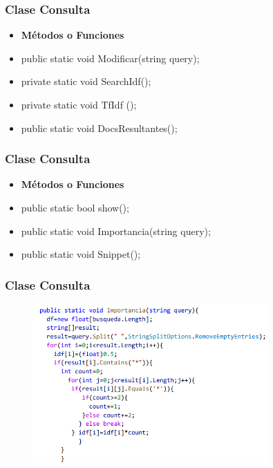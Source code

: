 \documentclass[17pt]{beamer}
\begin{document}
         \begin{frame}
\frametitle{Clase Consulta}
\begin{itemize}
    \item[] \textbf{Métodos o Funciones}
 \item public static void Modificar(string query);
 \item private static void SearchIdf();
\item private static void TfIdf ();
\item public static void DocsResultantes();
  \end{itemize}
 \end{frame}
 \begin{frame}
    \frametitle{Clase Consulta}
\begin{itemize}
    \item[] \textbf{Métodos o Funciones}
    \item public static bool show();
    \item public static void Importancia(string query);
    \item public static void Snippet();
     \end{itemize}
   \end{frame}
   \begin{frame}
    \frametitle{Clase Consulta}
    \begin{figure}
        \includegraphics[width=9cm]{code 6.png}
    \end{figure}
 
    
 
 \end{frame}


    


    
\end{document}
